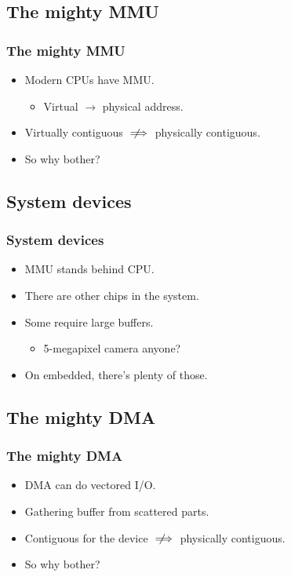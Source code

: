 
\subsection{The mighty MMU}
\begin{frame}
  \frametitle{The mighty MMU}

  \begin{itemize}
  \item Modern CPUs have MMU.
    \begin{itemize}
    \item Virtual $\rightarrow$ physical address.
    \end{itemize}
  \item Virtually contiguous $\notimplies$ physically contiguous.
  \item So why bother?
  \end{itemize}
\end{frame}

\subsection{System devices}
\begin{frame}
  \frametitle{System devices}

  \begin{itemize}
  \item MMU stands behind CPU.
  \item There are other chips in the system.
  \item Some require large buffers.
    \begin{itemize}
    \item 5-megapixel camera anyone?
    \end{itemize}
  \item On embedded, there's plenty of those.
  \end{itemize}
\end{frame}

\subsection{The mighty DMA}
\begin{frame}
  \frametitle{The mighty DMA}

  \begin{itemize}
  \item DMA can do vectored I/O.
  \item Gathering buffer from scattered parts.
  \item Contiguous for the device $\notimplies$ physically contiguous.
  \item So why bother?
  \end{itemize}
\end{frame}


